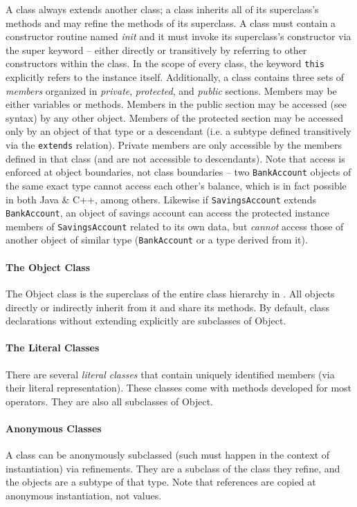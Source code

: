 A class always extends another class; a class inherits all of its superclass's methods and may refine the methods of its superclass. A class must contain a constructor routine named \textit{init} and it must invoke its superclass's constructor via the super keyword -- either directly or transitively by referring to other constructors within the class. In the scope of every class, the keyword \verb!this! explicitly refers to the instance itself. Additionally, a class contains three sets of \textit{members} organized in \textit{private}, \textit{protected}, and \textit{public} sections. Members may be either variables or methods. Members in the public section may be accessed (see syntax) by any other object. Members of the protected section may be accessed only by an object of that type or a descendant (i.e. a subtype defined transitively via the \verb!extends! relation). Private members are only accessible by the members defined in that class (and are not accessible to descendants). Note that access is enforced at object boundaries, not class boundaries -- two \verb!BankAccount! objects of the same exact type cannot access each other's balance, which is in fact possible in both Java \& C++, among others. Likewise if \verb!SavingsAccount! extends \verb!BankAccount!, an object of savings account can access the protected instance members of \verb!SavingsAccount! related to its own data, but \emph{cannot} access those of another object of similar type (\verb!BankAccount! or a type derived from it).

\paragraph{The Object Class}
The Object class is the superclass of the entire class hierarchy in \Lang{}. All objects directly or indirectly inherit from it and share its methods. By default, class declarations without extending explicitly are subclasses of Object.

\paragraph{The Literal Classes}
There are several \textit{literal classes} that contain uniquely identified members (via their literal representation). These classes come with methods developed for most operators. They are also all subclasses of Object.

\paragraph{Anonymous Classes}
A class can be anonymously subclassed (such must happen in the context of instantiation) via refinements. They are a subclass of the class they refine, and the objects are a subtype of that type. Note that references are copied at anonymous instantiation, not values.


